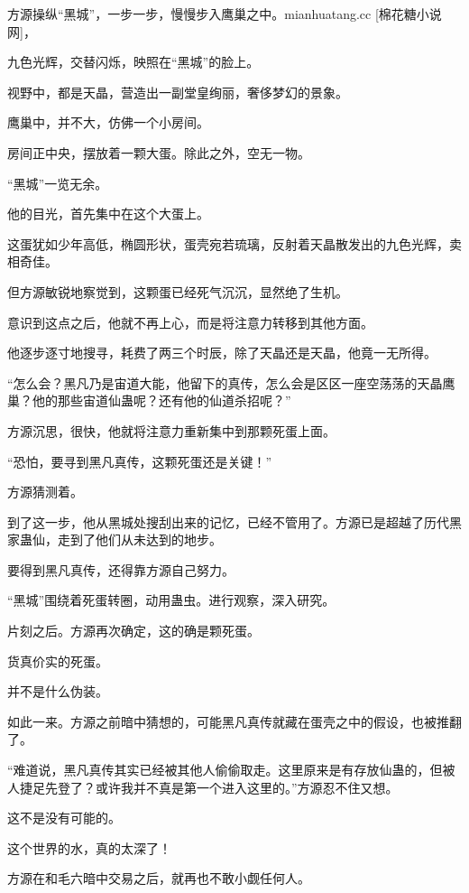 
\begin{this_body}

方源操纵“黑城”，一步一步，慢慢步入鹰巢之中。mianhuatang.cc [棉花糖小说网]，

九色光辉，交替闪烁，映照在“黑城”的脸上。

视野中，都是天晶，营造出一副堂皇绚丽，奢侈梦幻的景象。

鹰巢中，并不大，仿佛一个小房间。

房间正中央，摆放着一颗大蛋。除此之外，空无一物。

“黑城”一览无余。

他的目光，首先集中在这个大蛋上。

这蛋犹如少年高低，椭圆形状，蛋壳宛若琉璃，反射着天晶散发出的九色光辉，卖相奇佳。

但方源敏锐地察觉到，这颗蛋已经死气沉沉，显然绝了生机。

意识到这点之后，他就不再上心，而是将注意力转移到其他方面。

他逐步逐寸地搜寻，耗费了两三个时辰，除了天晶还是天晶，他竟一无所得。

“怎么会？黑凡乃是宙道大能，他留下的真传，怎么会是区区一座空荡荡的天晶鹰巢？他的那些宙道仙蛊呢？还有他的仙道杀招呢？”

方源沉思，很快，他就将注意力重新集中到那颗死蛋上面。

“恐怕，要寻到黑凡真传，这颗死蛋还是关键！”

方源猜测着。

到了这一步，他从黑城处搜刮出来的记忆，已经不管用了。方源已是超越了历代黑家蛊仙，走到了他们从未达到的地步。

要得到黑凡真传，还得靠方源自己努力。

“黑城”围绕着死蛋转圈，动用蛊虫。进行观察，深入研究。

片刻之后。方源再次确定，这的确是颗死蛋。

货真价实的死蛋。

并不是什么伪装。

如此一来。方源之前暗中猜想的，可能黑凡真传就藏在蛋壳之中的假设，也被推翻了。

“难道说，黑凡真传其实已经被其他人偷偷取走。这里原来是有存放仙蛊的，但被人捷足先登了？或许我并不真是第一个进入这里的。”方源忍不住又想。

这不是没有可能的。

这个世界的水，真的太深了！

方源在和毛六暗中交易之后，就再也不敢小觑任何人。


\end{this_body}
